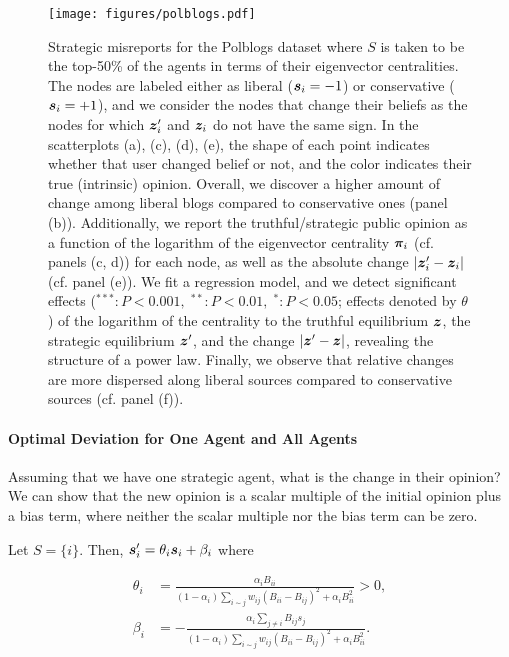 \begin{figure}[t]
    \centering
    \texttt{[image: figures/polblogs.pdf]}
    \caption{Strategic misreports for the Polblogs dataset where $S$ is taken to be the top-50\% of the agents in terms of their eigenvector centralities. The nodes are labeled either as liberal ($\bm{s}_i = -1$) or conservative ($\bm{s}_i = +1$), and we consider the nodes that change their beliefs as the nodes for which $\bm{z}_i'$ and $\bm{z}_i$ do not have the same sign. In the scatterplots (a), (c), (d), (e), the shape of each point indicates whether that user changed belief or not, and the color indicates their true (intrinsic) opinion. 
    Overall, we discover a higher amount of change among liberal blogs compared to conservative ones (panel (b)). Additionally, we report the truthful/strategic public opinion as a function of the logarithm of the eigenvector centrality $\bm{\pi}_i$ (cf. panels (c, d)) for each node, as well as the absolute change $|\bm{z}_i' - \bm{z}_i|$ (cf. panel (e)). We fit a regression model, and we detect significant effects ($^{***}: P < 0.001, \; ^{**}: P < 0.01, \; ^{*}: P < 0.05$; effects denoted by $\theta$) of the logarithm of the centrality to the truthful equilibrium $\bm{z}$, the strategic equilibrium $\bm{z}'$, and the change $|\bm{z}' - \bm{z}|$, revealing the structure of a power law. Finally, we observe that relative changes are more dispersed along liberal sources compared to conservative sources (cf. panel (f)).} 
    \label{fig:polblogs}
\end{figure}
\vspace{-1em}

\paragraph{Optimal Deviation for One Agent and All Agents} Assuming that we have one strategic agent, what is the change in their opinion? We can show that the new opinion is a scalar multiple of the initial opinion plus a bias term, where neither the scalar multiple nor the bias term can be zero. 

\begin{corollary} \label{theorem:one_deviation}
    Let $S = \{ i \}$. Then, $\bm{s}_i^\prime = \theta_i \bm{s}_i + \beta_i$ where

    \begin{align*}
        \theta_i & = \frac {\alpha_i B_{ii}} {(1 - \alpha_i) \sum_{i \sim j} w_{ij} (B_{ii} - B_{ij})^2 + \alpha_i B_{ii}^2} > 0, \\
        \beta_i & = - \frac {\alpha_i \sum_{j \neq i} B_{ij} s_j} {(1 - \alpha_i) \sum_{i \sim j} w_{ij} (B_{ii} - B_{ij})^2 + \alpha_i B_{ii}^2}.
    \end{align*}

\end{corollary}
 
